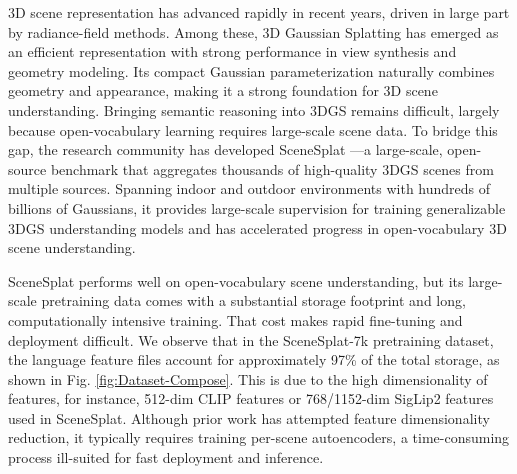 \documentclass{article}
\begin{document}
3D scene representation has advanced rapidly in recent years, driven in large part by radiance-field methods. Among these, 3D Gaussian Splatting \cite{kerbl3Dgaussians} has emerged as an efficient representation with strong performance in view synthesis and geometry modeling. Its compact Gaussian parameterization naturally combines geometry and appearance, making it a strong foundation for 3D scene understanding.
Bringing semantic reasoning into 3DGS remains difficult, largely because open-vocabulary learning requires large-scale scene data. To bridge this gap, the research community has developed SceneSplat \cite{li2025scenesplat,ma2025scenesplatpp}—a large-scale, open-source benchmark that aggregates thousands of high-quality 3DGS scenes from multiple sources. Spanning indoor and outdoor environments with hundreds of billions of Gaussians, it provides large-scale supervision for training generalizable 3DGS understanding models and has accelerated progress in open-vocabulary 3D scene understanding.

SceneSplat performs well on open-vocabulary scene understanding, but its large-scale pretraining data comes with a substantial storage footprint and long, computationally intensive training. That cost makes rapid fine-tuning and deployment difficult. We observe that in the SceneSplat-7k pretraining dataset, the language feature files account for approximately 97\% of the total storage, as shown in Fig. \ref{fig:Dataset-Compose}. This is due to the high dimensionality of features, for instance, 512-dim CLIP \cite{big_vision} features or 768/1152-dim SigLip2 \cite{tschannen2025siglip} features used in SceneSplat. Although prior work has attempted feature dimensionality reduction, it typically requires training per-scene autoencoders, a time-consuming process ill-suited for fast deployment and inference.
\end{document}
